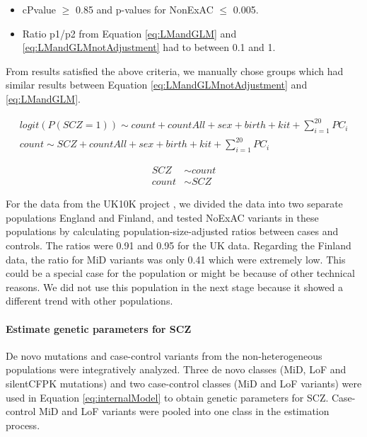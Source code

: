\documentclass[]{article}
\begin{document}
\begin{itemize}
\item cPvalue $\ge$ 0.85 and p-values for NonExAC $\le$ 0.005.
\item Ratio p1/p2 from Equation \ref{eq:LMandGLM} and
  \ref{eq:LMandGLMnotAdjustment} had to between 0.1 and 1.
\end{itemize}

From results satisfied the above criteria, we manually chose groups
which had similar results between Equation
\ref{eq:LMandGLMnotAdjustment} and \ref{eq:LMandGLM}.


\begin{equation} \label{eq:LMandGLM}
\begin{array}{ll}
logit(P(SCZ = 1)) \sim count + countAll + sex + birth + kit +
  \sum \limits_{i=1}^{20} PC_i \\
count \sim SCZ + countAll + sex + birth + kit + \sum \limits_{i=1}^{20} PC_i
\end{array}
\end{equation}


\begin{equation} \label{eq:LMandGLMnotAdjustment}
\begin{array}{ll}
SCZ & \sim count \\
count & \sim SCZ
\end{array}
\end{equation}

For the data from the UK10K project
\citep{singh2016rare}, we divided the data into two separate
populations England and Finland, and tested NoExAC variants in these
populations by calculating population-size-adjusted ratios between cases
and controls. The ratios were 0.91 and 0.95 for the UK data.
Regarding the Finland data, the ratio for MiD variants was only 0.41 which were
extremely low. This could be a special case for the population or might
be because of other technical reasons. We did not use this population in
the next stage because it showed a different trend with other populations.

\paragraph{Estimate genetic parameters for SCZ}

De novo mutations and case-control variants from the non-heterogeneous
populations were integratively analyzed. Three de novo classes (MiD,
LoF and silentCFPK mutations) and two case-control classes (MiD and
LoF variants) were used in Equation \ref{eq:internalModel} to obtain
genetic parameters for SCZ. Case-control MiD and LoF variants were
pooled into one class in the estimation process.
\end{document}
